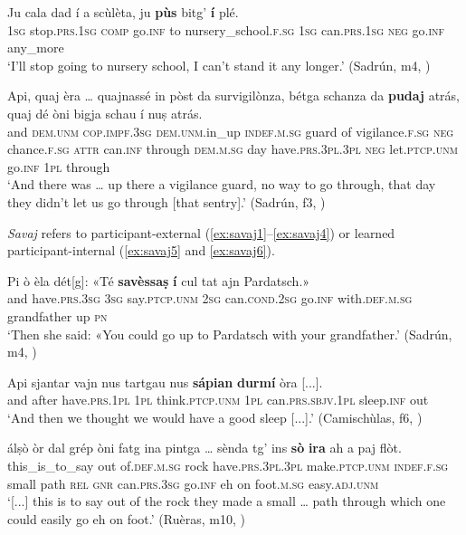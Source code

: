 \ea
\label{ex:pudaj3}
\gll  Ju cala dad í a scùlèta, ju \textbf{pùs} bitg' \textbf{í} plé.\\
\textsc{1sg} stop.\textsc{prs.1sg} \textsc{comp} go.\textsc{inf} to nursery\_school.\textsc{f.sg} \textsc{1sg} can.\textsc{prs.1sg} \textsc{neg} go.\textsc{inf} any\_more  \\
\glt `I’ll stop going to nursery school, I can’t stand it any longer.' (Sadrún, m4, )
\z

\ea
\label{ex:pudaj4}
\gll  Api, quaj èra … quajnassé in pòst da survigilònza, bétga schanza da \textbf{pudaj} atrás, quaj dé òni bigja schau í nuṣ atrás.\\
and \textsc{dem.unm} \textsc{cop.impf.3sg} {} \textsc{dem.unm}.in\_up \textsc{indef.m.sg} guard of vigilance.\textsc{f.sg} \textsc{neg} chance.\textsc{f.sg} \textsc{attr} can.\textsc{inf} through \textsc{dem.m.sg} day have.\textsc{prs.3pl.3pl} \textsc{neg} let.\textsc{ptcp.unm} go.\textsc{inf} \textsc{1pl} through\\
\glt `And there was … up there a vigilance guard, no way to go through, that day they didn’t let us go through [that sentry].' (Sadrún, f3, )
\z

\textit{Savaj} refers to participant-external (\ref{ex:savaj1}--\ref{ex:savaj4}) or learned participant-internal  (\ref{ex:savaj5} and \ref{ex:savaj6}). 

\ea
\label{ex:savaj1}
\gll  Pi ò èla dét[g]: «Té \textbf{savèssaṣ} \textbf{í} cul tat ajn Pardatsch.»  \\
and have.\textsc{prs.3sg} \textsc{3sg} say.\textsc{ptcp.unm} \textsc{2sg} can.\textsc{cond.2sg} go.\textsc{inf} with.\textsc{def.m.sg} grandfather up \textsc{pn}  \\
\glt `Then she said: «You could go up to Pardatsch with your grandfather.' (Sadrún, m4, )
\z

\ea
\label{ex:savaj2}
\gll    Api sjantar vajn nus tartgau nus \textbf{sápian} \textbf{durmí} òra [...].\\
and after have.\textsc{prs.1pl} \textsc{1pl} think.\textsc{ptcp.unm} \textsc{1pl}  can.\textsc{prs.sbjv.1pl} sleep.\textsc{inf} out\\
\glt `And then we thought we would have a good sleep [...].' (Camischùlas, f6, )
\z

\ea
\label{ex:savaj3}
\gll  [...] álṣò òr dal grép òni fatg ina pintga …  sènda tg’ ins \textbf{sò} \textbf{ira} ah a paj flòt.\\
{} this\_is\_to\_say out of.\textsc{def.m.sg} rock have.\textsc{prs.3pl.3pl} make.\textsc{ptcp.unm} \textsc{indef.f.sg} small {} path \textsc{rel} \textsc{gnr} can.\textsc{prs.3sg} go.\textsc{inf} eh on foot.\textsc{m.sg} easy.\textsc{adj.unm} \\
\glt `[...] this is to say out of the rock they made a small … path through which one could easily go eh on foot.' (Ruèras, m10, )
\z

